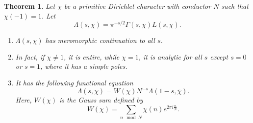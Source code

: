 \documentclass[a4paper, 12pt]{article}
\theoremstyle{Mydefinition}
\theoremstyle{Mytheorem}
\newtheorem{theorem}[statement]{Theorem}
\begin{document}
\begin{theorem}
Let $\chi$ be a primitive Dirichlet character with conductor $N$ such that $\chi(-1)=1$. Let
\begin{equation*}
    \Lambda(s, \chi) = \pi^{-s/2}\Gamma(s,\chi)L(s,\chi).
\end{equation*}
\begin{enumerate}
    \item[(1)] $\Lambda(s,\chi)$ has meromorphic continuation to all $s$.
    \item[(2)] In fact, if $\chi\neq 1$, it is entire, while $\chi = 1$, it is analytic for all $s$ except $s=0$ or $s=1$, where it has a simple poles.
    \item[(3)] It has the following functional equation
    \begin{equation*}
        \Lambda(s,\chi) = W(\chi)N^{-s}\Lambda(1-s, \overline{\chi}).
    \end{equation*}
    Here, $W(\chi)$ is the Gauss sum defined by
    \begin{equation*}
        W(\chi) = \sum_{n\mod N}\chi(n)e^{2\pi i \frac{n}{N}}.
    \end{equation*}
\end{enumerate}
\end{theorem}
\end{document}
